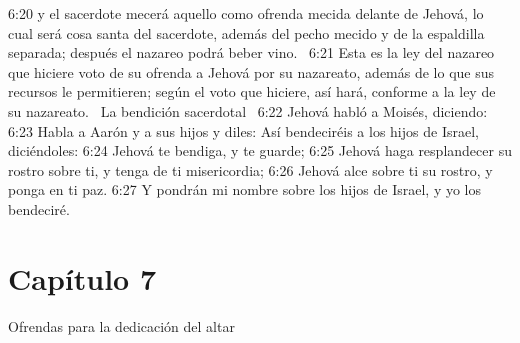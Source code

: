 6:20 y el sacerdote mecerá aquello como ofrenda mecida delante de Jehová, lo cual será cosa santa del sacerdote, además del pecho mecido y de la espaldilla separada; después el nazareo podrá beber vino.  
6:21 Esta es la ley del nazareo que hiciere voto de su ofrenda a Jehová por su nazareato, además de lo que sus recursos le permitieren; según el voto que hiciere, así hará, conforme a la ley de su nazareato.  
La bendición sacerdotal  
6:22 Jehová habló a Moisés, diciendo:  
6:23 Habla a Aarón y a sus hijos y diles: Así bendeciréis a los hijos de Israel, diciéndoles: 
6:24 Jehová te bendiga, y te guarde; 
6:25 Jehová haga resplandecer su rostro sobre ti, y tenga de ti misericordia; 
6:26 Jehová alce sobre ti su rostro, y ponga en ti paz. 
6:27 Y pondrán mi nombre sobre los hijos de Israel, y yo los bendeciré. 
\section*{Capítulo 7}
Ofrendas para la dedicación del altar 


